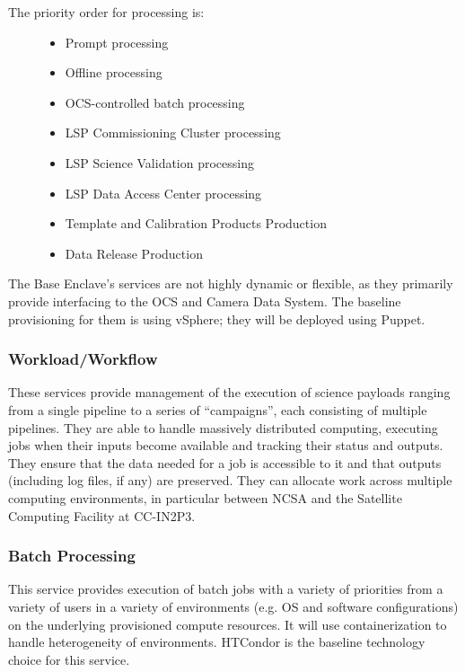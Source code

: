\documentclass[DM,lsstdraft,toc]{lsstdoc}
\begin{document}
\begin{description}
\item[The priority order for processing is:]
\begin{itemize}
\tightlist
\item
  Prompt processing
\item
  Offline processing
\item
  OCS-controlled batch processing
\item
  LSP Commissioning Cluster processing
\item
  LSP Science Validation processing
\item
  LSP Data Access Center processing
\item
  Template and Calibration Products Production
\item
  Data Release Production
\end{itemize}
\end{description}

The Base Enclave's services are not highly dynamic or flexible, as they
primarily provide interfacing to the OCS and Camera Data System. The
baseline provisioning for them is using vSphere; they will be deployed
using Puppet.

\subsubsection{Workload/Workflow}\label{workloadworkflow}

These services provide management of the execution of science payloads
ranging from a single pipeline to a series of ``campaigns'', each
consisting of multiple pipelines. They are able to handle massively
distributed computing, executing jobs when their inputs become available
and tracking their status and outputs. They ensure that the data needed
for a job is accessible to it and that outputs (including log files, if
any) are preserved. They can allocate work across multiple computing
environments, in particular between NCSA and the Satellite Computing
Facility at CC-IN2P3.

\subsubsection{Batch Processing}\label{batch-processing}

This service provides execution of batch jobs with a variety of
priorities from a variety of users in a variety of environments (e.g. OS
and software configurations) on the underlying provisioned compute
resources. It will use containerization to handle heterogeneity of
environments. HTCondor is the baseline technology choice for this
service.
\end{document}
